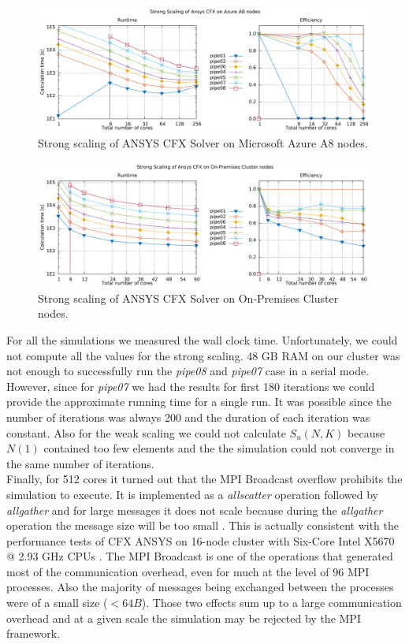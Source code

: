\documentclass[3p,times]{elsarticle}
\begin{document}

\begin{figure}
\centering
	\centering
	\includegraphics[width=.7\linewidth]{gplt-a8-strong-pipe}	
	\caption{Strong scaling of ANSYS CFX Solver on Microsoft Azure A8 nodes. }
	\label{fig:strongA8}
\end{figure}

\begin{figure}
	\centering
	\includegraphics[width=.7\linewidth]{gplt-hsr-strong-pipe}
	\caption{Strong scaling of ANSYS CFX Solver on On-Premises Cluster nodes. }
	\label{fig:strongHSR}
\end{figure}


For all the simulations we measured the wall clock time. Unfortunately, we could not compute all the values for the strong scaling. 48 GB RAM on our cluster was not enough to successfully run the \textit{pipe08} and \textit{pipe07} case in a serial mode. However, since for \textit{pipe07} we had the results for first 180 iterations we could provide the approximate running time for a single run. It was possible since the number of iterations was always 200 and the duration of each iteration was constant. Also for the weak scaling we could not calculate $S_u(N,K)$ because $N(1)$ contained too few elements and the the simulation could not converge in the same number of iterations. \\
Finally, for 512 cores it turned out that the MPI Broadcast overflow prohibits the simulation to execute. It is implemented as a \textit{allscatter} operation followed by \textit{allgather} and for large messages it does not scale because during the \textit{allgather} operation the message size will be too small \cite{Balaji}. This is actually consistent with the performance tests of CFX ANSYS on 16-node cluster with Six-Core Intel X5670 @ 2.93 GHz CPUs \cite{ansysScaling}. The MPI Broadcast is one of the operations that generated most of the communication overhead, even for much at the level of 96 MPI processes. Also the majority of messages being exchanged between the processes were of a small size ($< 64B$). Those two effects sum up to a large communication overhead and at a given scale the simulation may be rejected by the MPI framework.
\end{document}
